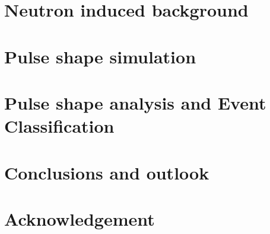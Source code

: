 \documentclass[11pt,a4paper]{book}
\begin{document}
\chapter{Neutron induced background}
\label{cha:neutron}


\chapter{Pulse shape simulation}
\label{cha:pss}

\clearpage{\pagestyle{empty}\cleardoublepage}

\chapter{Pulse shape analysis and Event Classification}
\label{cha:psa}


\chapter{Conclusions and outlook}
\label{cha:con}

\clearpage{\pagestyle{empty}\cleardoublepage}

\chapter*{Acknowledgement}
\label{cha:ack}
 
\clearpage{\pagestyle{empty}\cleardoublepage}


\end{document}
